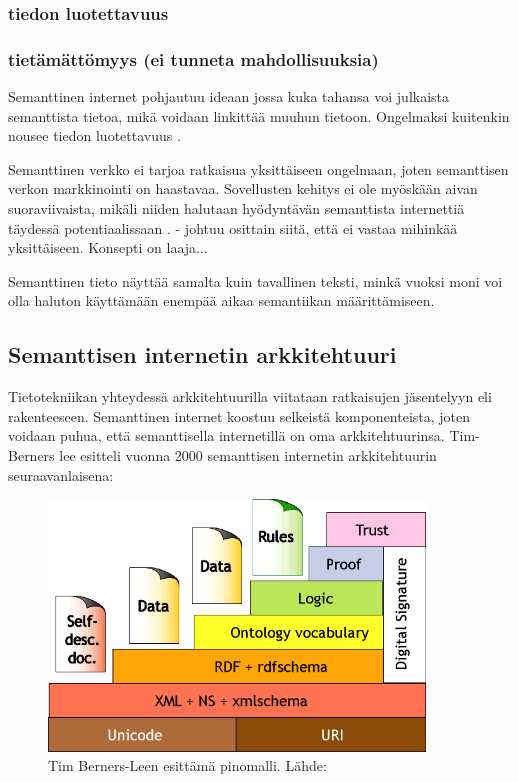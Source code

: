 \documentclass[finnish, 12pt, a4paper, elec, utf8, pdfa, online]{aaltothesis}
\begin{document}
{\subsubsection{tiedon luotettavuus}

\subsubsection{tietämättömyys (ei tunneta mahdollisuuksia)}
Semanttinen internet pohjautuu ideaan jossa kuka tahansa voi julkaista semanttista tietoa, mikä voidaan linkittää muuhun tietoon. Ongelmaksi kuitenkin nousee tiedon luotettavuus \cite{Semantic_search}.

Semanttinen verkko ei tarjoa ratkaisua yksittäiseen ongelmaan, joten semanttisen verkon markkinointi on haastavaa. Sovellusten kehitys ei ole myöskään aivan suoraviivaista, mikäli niiden halutaan hyödyntävän semanttista internettiä täydessä potentiaalissaan \cite{lassila_dissertion}.
- johtuu osittain siitä, että ei vastaa mihinkää yksittäiseen. Konsepti on laaja...

Semanttinen tieto näyttää samalta kuin tavallinen teksti, minkä vuoksi moni voi olla haluton käyttämään enempää aikaa semantiikan määrittämiseen.





\subsection{Semanttisen internetin arkkitehtuuri}
Tietotekniikan yhteydessä arkkitehtuurilla viitataan ratkaisujen jäsentelyyn eli rakenteeseen. Semanttinen internet koostuu selkeistä komponenteista, joten voidaan puhua, että semanttisella internetillä on oma arkkitehtuurinsa. Tim-Berners lee esitteli vuonna 2000 semanttisen internetin arkkitehtuurin seuraavanlaisena:

\begin{figure}[htb]
\centering
\includegraphics[width=10cm]{images/sweb-stack.png}
\caption{Tim Berners-Leen esittämä pinomalli. Lähde: \cite{stack_bl} \label{images/sweb-stack.png}}
\end{figure}
\clearpage %

}
\end{document}
